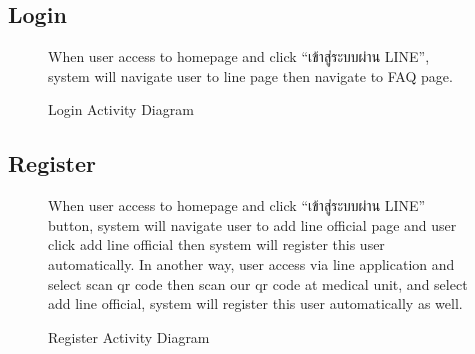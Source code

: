 \documentclass[12pt,oneside,openright,a4paper]{cpe-english-project}
\begin{document}
      \subsection{Login}
      \begin{figure}[!h]
        \centering
        \caption{Login Activity Diagram}\label{fig:AD_Login}
        \begin{flushleft}
          \qquad When user access to homepage and click “\textthai{เข้าสู่ระบบผ่าน} LINE”, system will navigate user to line page then navigate to FAQ page. \par
        \end{flushleft}
      \end{figure}
\newpage
      \subsection{Register}
      \begin{figure}[!h]
        \centering
        \caption{Register Activity Diagram}\label{fig:AD_Register}
        \begin{flushleft}
          \qquad When user access to homepage and click “\textthai{เข้าสู่ระบบผ่าน} LINE” button, system will navigate user to add line official page and user click add line official then system will register this user automatically. In another way, user access via line application and select scan qr code then scan our qr code at medical unit, and select add line official, system will register this user automatically as well. \par
        \end{flushleft}
      \end{figure}
\end{document}
